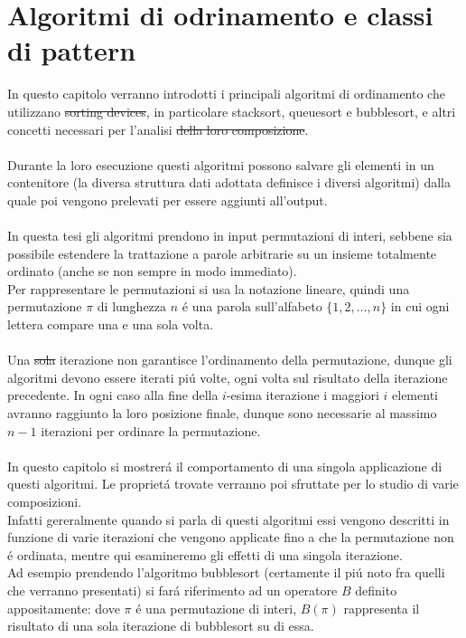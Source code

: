 \chapter{Algoritmi di odrinamento e classi di pattern}
In questo capitolo verranno introdotti i principali algoritmi di ordinamento che utilizzano \st{sorting devices}, in particolare stacksort,
queuesort e bubblesort, e altri concetti necessari per l'analisi \st{della loro composizione}.\\\\
Durante la loro esecuzione questi algoritmi possono salvare gli elementi in un contenitore (la diversa struttura dati adottata definisce i diversi algoritmi) dalla quale poi vengono prelevati per essere aggiunti all'output.\\\\
In questa tesi gli algoritmi prendono in input permutazioni di interi, sebbene sia possibile estendere la trattazione a parole arbitrarie su un insieme totalmente ordinato (anche se non sempre in modo immediato).\\
Per rappresentare le permutazioni si usa la notazione lineare, quindi una permutazione $\pi$ di lunghezza $n$ \'e una parola sull'alfabeto $\{1, 2, \dots, n\}$ in cui ogni lettera compare una e una sola volta.\\\\
Una \st{sola} iterazione non garantisce l'ordinamento della permutazione,
dunque gli algoritmi devono essere iterati pi\'u volte, ogni volta sul risultato della iterazione precedente. In ogni caso alla fine della $i$-esima
iterazione i maggiori $i$ elementi avranno raggiunto la loro posizione finale, 
dunque sono necessarie al massimo $n-1$ iterazioni per ordinare la permutazione.\\\\
In questo capitolo si mostrer\'a il comportamento di una singola applicazione di questi algoritmi. Le propriet\'a trovate verranno poi sfruttate per lo studio di varie composizioni.\\
Infatti gereralmente quando si parla di questi algoritmi essi vengono descritti in funzione di varie iterazioni che vengono applicate fino a che la permutazione non \'e ordinata, mentre qui esamineremo gli effetti di una singola iterazione.\\
Ad esempio prendendo l'algoritmo bubblesort (certamente il pi\'u noto fra quelli che verranno presentati) si far\'a riferimento ad un operatore $B$ definito appositamente: dove $\pi$ \'e una permutazione di
interi, $B(\pi)$ rappresenta il risultato di una sola iterazione di bubblesort su di essa.
